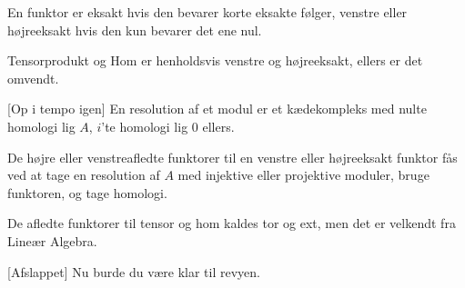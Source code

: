 \documentclass[a4paper,11pt]{article}
\DeclareMathOperator{\im}{im}
\begin{document}
\begin{sketch}




 En funktor er eksakt hvis den bevarer korte eksakte følger, venstre eller højreeksakt hvis den kun bevarer det ene nul.


 Tensorprodukt og Hom er henholdsvis venstre og højreeksakt, ellers er det omvendt.


[Op i tempo igen]  En resolution af et modul er et kædekompleks med nulte homologi lig $A$, $i$'te homologi lig 0 ellers.


 De højre eller venstreafledte funktorer til en venstre eller højreeksakt funktor
fås ved at tage en resolution af $A$ med injektive eller projektive moduler, bruge funktoren,
og tage homologi.


 De afledte funktorer til tensor og hom kaldes tor og ext, men det er velkendt fra Lineær Algebra. 

[Afslappet] Nu burde du være klar til revyen.


\end{sketch}
\end{document}
